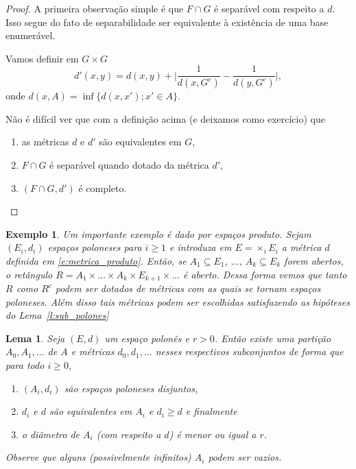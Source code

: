 \documentclass[reqno, draft]{book}
\newcommand*\1{\mathds{1}}
\newtheorem{lemma}[theorem]{Lema}
\newtheorem{example}{Exemplo}[section]
\begin{document}
\begin{proof}
  A primeira observação simple é que $F \cap G$ é separável com respeito a $d$.
  Isso segue do fato de separabilidade ser equivalente à existência de uma base enumerável.

  Vamos definir em $G \times G$
  \begin{equation}
    d'(x,y) = d(x,y) + \Big| \frac{1}{d(x,G^c)} - \frac{1}{d(y,G^c)} \Big|,
  \end{equation}
  onde $d(x,A) = \inf\{d(x,x'); x' \in A\}$.

  Não é difícil ver que com a definição acima (e deixamos como exercício) que
  \begin{enumerate}[\quad a)]
  \item as métricas $d$ e $d'$ são equivalentes em $G$,
  \item $F \cap G$ é separável quando dotado da métrica $d'$,
  \item $(F \cap G, d')$ é completo.
  \end{enumerate}
\end{proof}


\begin{example}
  Um importante exemplo é dado por espaços produto.
  Sejam $(E_i, d_i)$ espaços poloneses para $i \geq 1$ e introduza em $E = \times_i E_i$ a métrica $d$ definida em \eqref{e:metrica_produto}.
  Então, se $A_1 \subseteq E_1$, $\dots$, $A_k \subseteq E_k$ forem abertos, o retângulo $R = A_1 \times \dots \times A_k \times E_{k+1} \times \dots$ é aberto.
  Dessa forma vemos que tanto $R$ como $R^c$ podem ser dotados de métricas com as quais se tornam espaços poloneses.
  Além disso tais métricas podem ser escolhidas satisfazendo as hipóteses do Lema~\ref{l:sub_polones}
\end{example}

\begin{lemma}
  \label{l:particao_polones}
  Seja $(E, d)$ um espaço polonês e $r > 0$.
  Então existe uma partição $A_0, A_1, \dots$ de $A$ e métricas $d_0, d_1, \dots$ nesses respectivos subconjuntos de forma que para todo $i \geq 0$,
  \begin{enumerate}[\quad a)]
  \item $(A_i, d_i)$ são espaços poloneses disjuntos,
  \item $d_i$ e $d$ são equivalentes em $A_i$ e $d_i \geq d$ e finalmente
  \item o diâmetro de $A_i$ (com respeito a $d$) é menor ou igual a $r$.
  \end{enumerate}
  Observe que alguns (possivelmente infinitos) $A_i$ podem ser vazios.
\end{lemma}
\end{document}
